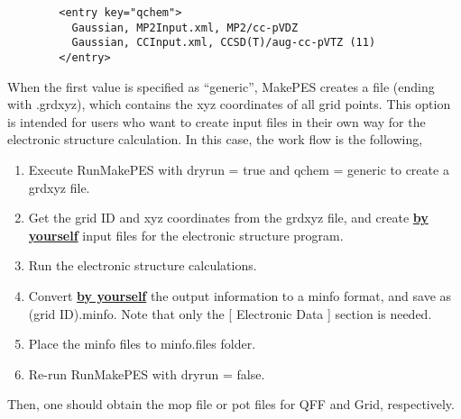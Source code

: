 \documentclass[a4paper,12pt]{article}
\begin{document}
\begin{itemize}
       \begin{verbatim}
        <entry key="qchem">
          Gaussian, MP2Input.xml, MP2/cc-pVDZ
          Gaussian, CCInput.xml, CCSD(T)/aug-cc-pVTZ (11)
        </entry> \end{verbatim}

       When the first value is specified as ``generic'', MakePES creates a file
       (ending with .grdxyz), which contains the xyz coordinates of all grid
       points. This option is intended for users who want to create input files
       in their own way for the electronic structure calculation. In this case,
       the work flow is the following,
       
       \begin{enumerate}
         \item Execute RunMakePES with dryrun = true and qchem = generic to
         create a grdxyz file.
         \item Get the grid ID and xyz coordinates from the grdxyz file, and
         create \underline{\bf by yourself}  input files for the electronic
         structure program.
         \item Run the electronic structure calculations.
         \item Convert \underline{\bf by yourself} the output information to a
         minfo format, and save as (grid ID).minfo. Note that only the [
         Electronic Data ] section is needed.
         \item Place the minfo files to minfo.files folder.
         \item Re-run RunMakePES with dryrun = false.
       \end{enumerate}
       
       Then, one should obtain the mop file or pot files for QFF and Grid,
       respectively.
       
   \end{itemize}
\end{document}
